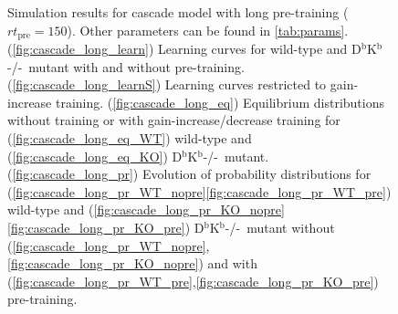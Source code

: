 \documentclass[12pt]{article}
\newcommand{\KO}{D$^\mathrm{b}$K$^\mathrm{b}$-/-}
\begin{document}
\begin{figure}
 \begin{center}
 \begin{myenuma}
  \item{}\label{fig:cascade_long_learn}
  \item{}\label{fig:cascade_long_learnS}
  \item\label{fig:cascade_long_eq}\begin{myenumi}
                    \item{}\label{fig:cascade_long_eq_WT}
                    \item{}\label{fig:cascade_long_eq_KO}
                  \end{myenumi}
  \item\label{fig:cascade_long_pr}\begin{myenumi}
                    \item{}\label{fig:cascade_long_pr_WT_nopre}
                    \item{}\label{fig:cascade_long_pr_WT_pre}
                    \item{}\label{fig:cascade_long_pr_KO_nopre}
                    \item{}\label{fig:cascade_long_pr_KO_pre}
                  \end{myenumi}
 \end{myenuma}
 \end{center}
  \caption{Simulation results for cascade model with long pre-training ($rt_\text{pre}=150$).
  Other parameters can be found in \autoref{tab:params}.
  (\ref{fig:cascade_long_learn}) Learning curves for wild-type and \KO\ mutant with and without pre-training.
  (\ref{fig:cascade_long_learnS}) Learning curves restricted to gain-increase training.
  (\ref{fig:cascade_long_eq}) Equilibrium distributions without training or with gain-increase/decrease training for (\ref{fig:cascade_long_eq_WT}) wild-type and (\ref{fig:cascade_long_eq_KO}) \KO\ mutant.
  (\ref{fig:cascade_long_pr}) Evolution of probability distributions for (\ref{fig:cascade_long_pr_WT_nopre}\ref{fig:cascade_long_pr_WT_pre}) wild-type and  (\ref{fig:cascade_long_pr_KO_nopre}\ref{fig:cascade_long_pr_KO_pre}) \KO\ mutant without (\ref{fig:cascade_long_pr_WT_nopre},\ref{fig:cascade_long_pr_KO_nopre}) and with (\ref{fig:cascade_long_pr_WT_pre},\ref{fig:cascade_long_pr_KO_pre}) pre-training. } \label{fig:cascade_long}
\end{figure}
\end{document}
